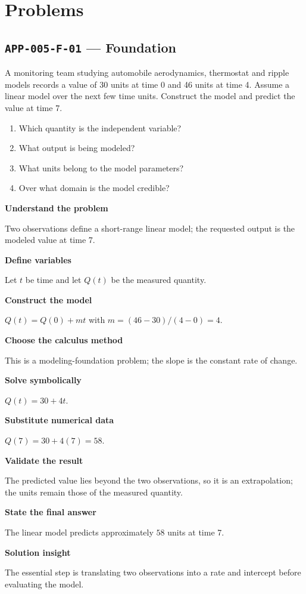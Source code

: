 \documentclass[11pt]{book}
\newcommand{\pid}[1]{\texttt{#1}}
\begin{document}
\section*{Problems}
\subsection*{\pid{APP-005-F-01} — Foundation}
\begin{problembox}
A monitoring team studying automobile aerodynamics, thermostat and ripple models records a value of 30 units at time 0 and 46 units at time 4. Assume a linear model over the next few time units. Construct the model and predict the value at time 7.
\end{problembox}
\begin{promptbox}\begin{enumerate}
\item Which quantity is the independent variable?
\item What output is being modeled?
\item What units belong to the model parameters?
\item Over what domain is the model credible?
\end{enumerate}\end{promptbox}
\begin{solutionbox}
\textbf{Understand the problem}\par Two observations define a short-range linear model; the requested output is the modeled value at time 7.\par\medskip
\textbf{Define variables}\par Let $t$ be time and let $Q(t)$ be the measured quantity.\par\medskip
\textbf{Construct the model}\par $Q(t)=Q(0)+mt$ with $m=(46-30)/(4-0)=4$.\par\medskip
\textbf{Choose the calculus method}\par This is a modeling-foundation problem; the slope is the constant rate of change.\par\medskip
\textbf{Solve symbolically}\par $Q(t)=30+4t$.\par\medskip
\textbf{Substitute numerical data}\par $Q(7)=30+4(7)=58$.\par\medskip
\textbf{Validate the result}\par The predicted value lies beyond the two observations, so it is an extrapolation; the units remain those of the measured quantity.\par\medskip
\textbf{State the final answer}\par The linear model predicts approximately $58$ units at time 7.\par\medskip
\textbf{Solution insight}\par The essential step is translating two observations into a rate and intercept before evaluating the model.\par\medskip
\end{solutionbox}
\end{document}
